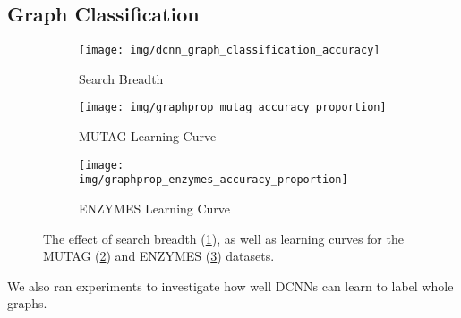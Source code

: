 \documentclass{article}
\newcommand{\subfigwidth}{0.3\textwidth}
\begin{document}
\subsection{Graph Classification}
\begin{figure}[t]
    \centering
    \begin{subfigure}[t]{\subfigwidth}
        \centering
        \texttt{[image: img/dcnn\_graph\_classification\_accuracy]}
        \caption{Search Breadth}
        \label{fig:graphclasssearch}
    \end{subfigure}
    \begin{subfigure}[t]{\subfigwidth}
        \centering
        \texttt{[image: img/graphprop\_mutag\_accuracy\_proportion]}
        \caption{MUTAG Learning Curve}
        \label{fig:graphclassmutag}
    \end{subfigure}
    \begin{subfigure}[t]{\subfigwidth}
        \centering
        \texttt{[image: img/graphprop\_enzymes\_accuracy\_proportion]}
        \caption{ENZYMES Learning Curve}
        \label{fig:graphclassenzymes}
    \end{subfigure}
    \caption{The effect of search breadth (\ref{fig:graphclasssearch}), as well as learning curves for the MUTAG (\ref{fig:graphclassmutag}) and ENZYMES (\ref{fig:graphclassenzymes}) datasets.}
    \label{fig:graphclass}
\end{figure}

We also ran experiments to investigate how well DCNNs can learn to label whole graphs.
\end{document}
